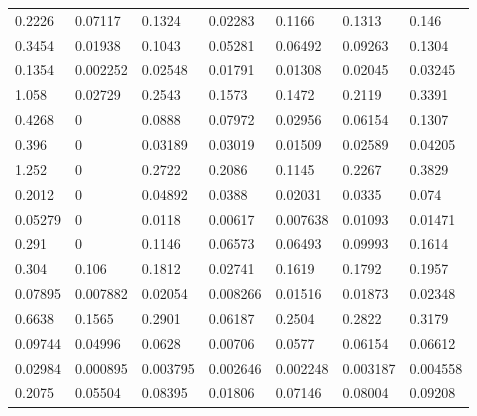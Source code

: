 \documentclass[11pt,a4paper]{article}
\numberwithin{equation}{section}
\begin{document}
\begin{table}[]
\begin{tabular}{lllllll}
0.2226  & 0.07117  & 0.1324   & 0.02283       & 0.1166       & 0.1313       & 0.146        \\
0.3454  & 0.01938  & 0.1043   & 0.05281       & 0.06492      & 0.09263      & 0.1304       \\
0.1354  & 0.002252 & 0.02548  & 0.01791       & 0.01308      & 0.02045      & 0.03245      \\
1.058   & 0.02729  & 0.2543   & 0.1573        & 0.1472       & 0.2119       & 0.3391       \\
0.4268  & 0			 & 0.0888   & 0.07972       & 0.02956      & 0.06154      & 0.1307       \\
0.396   & 0  		 & 0.03189  & 0.03019       & 0.01509      & 0.02589      & 0.04205      \\
1.252   & 0        & 0.2722   & 0.2086        & 0.1145       & 0.2267       & 0.3829       \\
0.2012  & 0        & 0.04892  & 0.0388        & 0.02031      & 0.0335       & 0.074        \\
0.05279 & 0  		 & 0.0118   & 0.00617       & 0.007638     & 0.01093      & 0.01471      \\
0.291   & 0			 & 0.1146   & 0.06573       & 0.06493      & 0.09993      & 0.1614       \\
0.304   & 0.106    & 0.1812   & 0.02741       & 0.1619       & 0.1792       & 0.1957       \\
0.07895 & 0.007882 & 0.02054  & 0.008266      & 0.01516      & 0.01873      & 0.02348      \\
0.6638  & 0.1565   & 0.2901   & 0.06187       & 0.2504       & 0.2822       & 0.3179       \\
0.09744 & 0.04996  & 0.0628   & 0.00706       & 0.0577       & 0.06154      & 0.06612      \\
0.02984 & 0.000895 & 0.003795 & 0.002646      & 0.002248     & 0.003187     & 0.004558     \\
0.2075  & 0.05504  & 0.08395  & 0.01806       & 0.07146      & 0.08004      & 0.09208     
\end{tabular}
\end{table}
\end{document}
